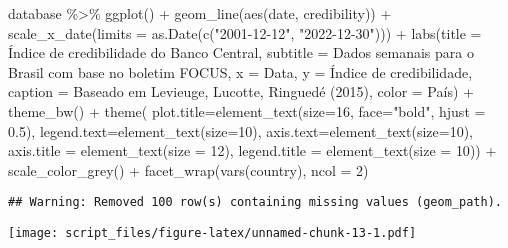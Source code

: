 \documentclass[
]{article}
\newenvironment{Shaded}{\begin{snugshade}}{\end{snugshade}}
\newcommand{\AttributeTok}[1]{\textcolor[rgb]{0.77,0.63,0.00}{#1}}
\newcommand{\DecValTok}[1]{\textcolor[rgb]{0.00,0.00,0.81}{#1}}
\newcommand{\FloatTok}[1]{\textcolor[rgb]{0.00,0.00,0.81}{#1}}
\newcommand{\FunctionTok}[1]{\textcolor[rgb]{0.00,0.00,0.00}{#1}}
\newcommand{\NormalTok}[1]{#1}
\newcommand{\SpecialCharTok}[1]{\textcolor[rgb]{0.00,0.00,0.00}{#1}}
\newcommand{\StringTok}[1]{\textcolor[rgb]{0.31,0.60,0.02}{#1}}
\begin{document}
\begin{Shaded}
\begin{Highlighting}[]
\NormalTok{database }\SpecialCharTok{\%\textgreater{}\%} 
  \FunctionTok{ggplot}\NormalTok{() }\SpecialCharTok{+} 
  \FunctionTok{geom\_line}\NormalTok{(}\FunctionTok{aes}\NormalTok{(date, credibility)) }\SpecialCharTok{+}
  \FunctionTok{scale\_x\_date}\NormalTok{(}\AttributeTok{limits =} \FunctionTok{as.Date}\NormalTok{(}\FunctionTok{c}\NormalTok{(}\StringTok{"2001{-}12{-}12"}\NormalTok{, }\StringTok{"2022{-}12{-}30"}\NormalTok{))) }\SpecialCharTok{+}
  \FunctionTok{labs}\NormalTok{(}\AttributeTok{title =} \StringTok{\textquotesingle{}Índice de credibilidade do Banco Central\textquotesingle{}}\NormalTok{,}
       \AttributeTok{subtitle =} \StringTok{\textquotesingle{}Dados semanais para o Brasil com base no boletim FOCUS\textquotesingle{}}\NormalTok{,}
       \AttributeTok{x =} \StringTok{\textquotesingle{}Data\textquotesingle{}}\NormalTok{,}
       \AttributeTok{y =} \StringTok{\textquotesingle{}Índice de credibilidade\textquotesingle{}}\NormalTok{,}
       \AttributeTok{caption =} \StringTok{\textquotesingle{}Baseado em Levieuge, Lucotte, Ringuedé (2015)\textquotesingle{}}\NormalTok{,}
       \AttributeTok{color =} \StringTok{\textquotesingle{}País\textquotesingle{}}\NormalTok{) }\SpecialCharTok{+}
  \FunctionTok{theme\_bw}\NormalTok{() }\SpecialCharTok{+}
  \FunctionTok{theme}\NormalTok{(}
    \AttributeTok{plot.title=}\FunctionTok{element\_text}\NormalTok{(}\AttributeTok{size=}\DecValTok{16}\NormalTok{, }\AttributeTok{face=}\StringTok{"bold"}\NormalTok{, }\AttributeTok{hjust =} \FloatTok{0.5}\NormalTok{),}
    \AttributeTok{legend.text=}\FunctionTok{element\_text}\NormalTok{(}\AttributeTok{size=}\DecValTok{10}\NormalTok{),}
    \AttributeTok{axis.text=}\FunctionTok{element\_text}\NormalTok{(}\AttributeTok{size=}\DecValTok{10}\NormalTok{),}
    \AttributeTok{axis.title =} \FunctionTok{element\_text}\NormalTok{(}\AttributeTok{size =} \DecValTok{12}\NormalTok{),}
    \AttributeTok{legend.title =} \FunctionTok{element\_text}\NormalTok{(}\AttributeTok{size =} \DecValTok{10}\NormalTok{)) }\SpecialCharTok{+}
  \FunctionTok{scale\_color\_grey}\NormalTok{() }\SpecialCharTok{+}
  \FunctionTok{facet\_wrap}\NormalTok{(}\FunctionTok{vars}\NormalTok{(country), }\AttributeTok{ncol =} \DecValTok{2}\NormalTok{)}
\end{Highlighting}
\end{Shaded}

\begin{verbatim}
## Warning: Removed 100 row(s) containing missing values (geom_path).
\end{verbatim}

\texttt{[image: script\_files/figure-latex/unnamed-chunk-13-1.pdf]}
\end{document}
